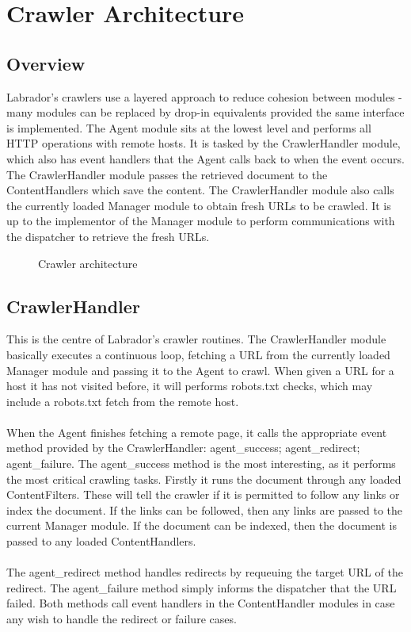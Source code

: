\section{Crawler Architecture}
\subsection{Overview}
Labrador's crawlers use a layered approach to reduce cohesion between modules - many modules can be replaced by drop-in equivalents provided the same interface is implemented. The Agent module sits at the lowest level and performs all HTTP operations with remote hosts. It is tasked by the CrawlerHandler module, which also has event handlers that the Agent calls back to when the event occurs. The CrawlerHandler module passes the retrieved document to the ContentHandlers which save the content. The CrawlerHandler module also calls the currently loaded Manager module to obtain fresh URLs to be crawled. It is up to the implementor of the Manager module to perform communications with the dispatcher to retrieve the fresh URLs.\\

\begin{figure}[h]
  \centerline{
   }
\label{fig-crawlerlayers}
\caption{Crawler architecture}
\end{figure}


\subsection{CrawlerHandler}
This is the centre of Labrador's crawler routines. The CrawlerHandler module basically executes a continuous loop, fetching a URL from the currently loaded Manager module and passing it to the Agent to crawl. When given a URL for a host it has not visited before, it will performs robots.txt checks, which may include a robots.txt fetch from the remote host.\\
\ \\
When the Agent finishes fetching a remote page, it calls the appropriate event method provided by the CrawlerHandler: agent\_success; agent\_redirect; agent\_failure. The agent\_success method is the most interesting, as it performs the most critical crawling tasks. Firstly it runs the document through any loaded ContentFilters. These will tell the crawler if it is permitted to follow any links or index the document. If the links can be followed, then any links are passed to the current Manager module. If the document can be indexed, then the document is passed to any loaded ContentHandlers.\\
\ \\
The agent\_redirect method handles redirects by requeuing the target URL of the redirect. The agent\_failure method simply informs the dispatcher that the URL failed. Both methods call event handlers in the ContentHandler modules in case any  wish to handle the redirect or failure cases.

